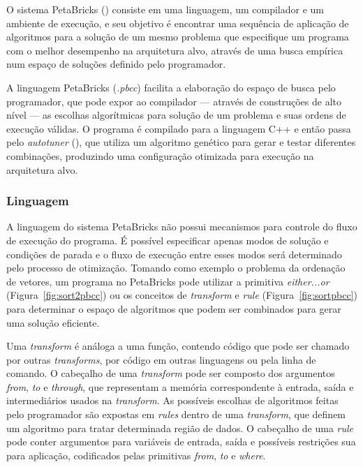 \documentclass[a4paper, 12pt]{article}
\begin{document}
O sistema PetaBricks (\citet{ansel2009petabricks, ansel2014phd, 
ansel:xrds:2010, mitcsail-tr:2014})
consiste em uma linguagem, um compilador e um ambiente de execução,
e seu objetivo é encontrar uma sequência de aplicação de algoritmos 
para a solução de um mesmo problema que especifique um programa com o melhor 
desempenho na arquitetura alvo, através de uma busca empírica num espaço
de soluções definido pelo programador.

A linguagem PetaBricks (\emph{.pbcc}) facilita a 
elaboração do espaço de busca pelo programador, que pode expor ao compilador 
--- através de construções de alto nível --- as escolhas algorítmicas 
para solução de um problema e suas ordens de execução válidas. O programa é 
compilado para a linguagem C++ e então passa pelo \emph{autotuner} 
(\citet{ansel2011efficient}), que utiliza um algoritmo genético para gerar e 
testar diferentes combinações, produzindo uma configuração otimizada para 
execução na arquitetura alvo.

\subsubsection{Linguagem}

A linguagem do sistema PetaBricks não possui mecanismos para controle do fluxo
de execução do programa. É possível especificar apenas modos de solução e 
condições de parada e o fluxo de execução entre esses modos será determinado 
pelo processo de otimização.
Tomando como exemplo o problema da ordenação de vetores, um programa no
PetaBricks pode utilizar a primitiva \emph{either...or} 
(Figura~\ref{fig:sort2pbcc}) ou os conceitos de \emph{transform} e \emph{rule}
(Figura~\ref{fig:sortpbcc}) para determinar o espaço de algoritmos que podem 
ser combinados para gerar uma solução eficiente.

Uma \emph{transform} é análoga a uma função, contendo código que pode
ser chamado por outras \emph{transforms}, por código em outras linguagens
ou pela linha de comando. O cabeçalho de uma \emph{transform} pode ser composto
dos argumentos \emph{from}, \emph{to} e \emph{through}, que representam a
memória correspondente à entrada, saída e intermediários usados na 
\emph{transform}.
As possíveis escolhas de algoritmos feitas pelo programador são expostas 
em \emph{rules} dentro de uma \emph{transform}, que definem um algoritmo
para tratar determinada região de dados. O cabeçalho de uma \emph{rule} pode
conter argumentos para variáveis de entrada, saída e possíveis restrições sua 
para aplicação, codificados pelas primitivas \emph{from}, \emph{to} e 
\emph{where}.
\end{document}

